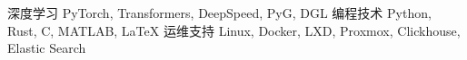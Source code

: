 

\begin{cvskills}
  \cvskill
    {深度学习} %
    {PyTorch, Transformers, DeepSpeed, PyG, DGL} %
  \cvskill
    {编程技术} %
    {Python, Rust, C, MATLAB, LaTeX}
  \cvskill
    {运维支持}
    {Linux, Docker, LXD, Proxmox, Clickhouse, Elastic Search}

\end{cvskills}
